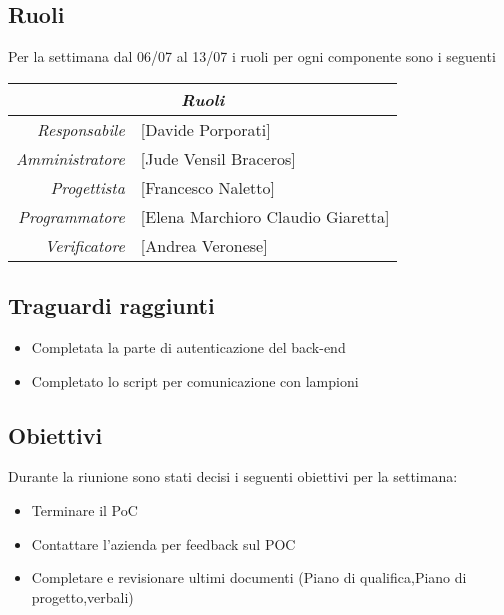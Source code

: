 \documentclass[12pt]{article}
\begin{document}
\subsection{Ruoli}
Per la settimana dal 06/07 al 13/07 i ruoli per ogni componente sono i seguenti
\\
\begin{tabular}{r | l}
    \multicolumn{2}{c}{\textit{Ruoli}}\\
    \hline
        \textit{Responsabile} &
        [Davide Porporati]\makecell{}\\
        \textit{Amministratore} &
        [Jude Vensil Braceros]\makecell{}\\
        \textit{Progettista} &
        [Francesco Naletto]\makecell{}\\
        \textit{Programmatore} &
        [Elena Marchioro Claudio Giaretta]\makecell{}\\
        \textit{Verificatore} & 
        [Andrea Veronese]\makecell{}\\
\end{tabular}

\subsection{Traguardi raggiunti}
\begin{itemize}
    \item Completata la parte di autenticazione del back-end
    \item Completato lo script per comunicazione con lampioni

\end{itemize}

\subsection{Obiettivi}
Durante la riunione sono stati decisi i seguenti obiettivi per la settimana:
\begin{itemize}
    \item Terminare il PoC
    \item Contattare l’azienda per feedback sul POC
    \item Completare e revisionare ultimi documenti (Piano di qualifica,Piano di progetto,verbali)
  
\end{itemize}
\end{document}
